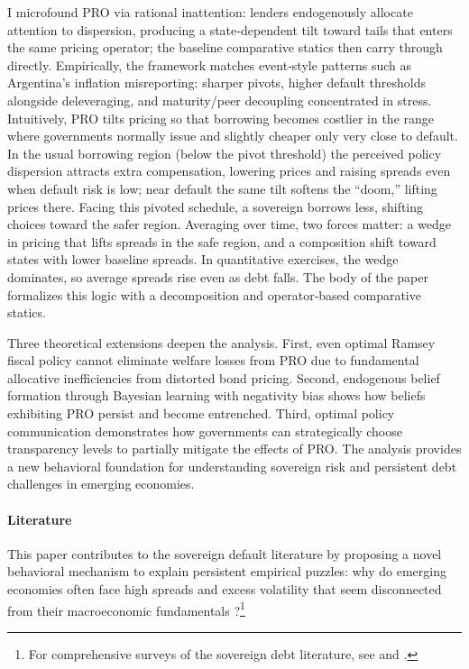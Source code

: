 \documentclass[12pt]{article}
\theoremstyle{plain}
\begin{document}
I microfound PRO via rational inattention: lenders endogenously allocate
attention to dispersion, producing a state‑dependent tilt toward tails that
enters the same pricing operator; the baseline comparative statics then carry
through directly. Empirically, the framework matches event‑style patterns such
as Argentina’s inflation misreporting: sharper pivots, higher default
thresholds alongside deleveraging, and maturity/peer decoupling concentrated in
stress. Intuitively, PRO tilts pricing so that borrowing becomes costlier in
the range where governments normally issue and slightly cheaper only very close
to default. In the usual borrowing region (below the pivot threshold) the
perceived policy dispersion attracts extra compensation, lowering prices and
raising spreads even when default risk is low; near default the same tilt
softens the “doom,” lifting prices there. Facing this pivoted schedule, a
sovereign borrows less, shifting choices toward the safer region. Averaging
over time, two forces matter: a wedge in pricing that lifts spreads in the safe
region, and a composition shift toward states with lower baseline spreads. In
quantitative exercises, the wedge dominates, so average spreads rise even as
debt falls. The body of the paper formalizes this logic with a decomposition
and operator‑based comparative statics.

Three theoretical extensions deepen the analysis. First, even optimal Ramsey
fiscal policy cannot eliminate welfare losses from PRO due to fundamental
allocative inefficiencies from distorted bond pricing. Second, endogenous
belief formation through Bayesian learning with negativity bias shows how
beliefs exhibiting PRO persist and become entrenched. Third, optimal policy
communication demonstrates how governments can strategically choose
transparency levels to partially mitigate the effects of PRO. The analysis
provides a new behavioral foundation for understanding sovereign risk and
persistent debt challenges in emerging economies.

\paragraph{Literature} This paper contributes to the sovereign default literature by proposing a novel
behavioral mechanism to explain persistent empirical puzzles: why do emerging
economies often face high spreads and excess volatility that seem disconnected
from their macroeconomic fundamentals \citet{TomzWright2013,
	MitchenerTrebesch2023}?\footnote{For comprehensive surveys of the sovereign
	debt literature, see \citet{MeyerReinhartTrebesch2022} and \citet{Abbas2019}.}
\end{document}

